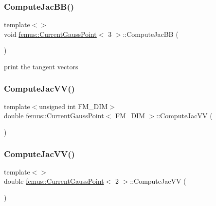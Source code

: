 \subsubsection{\texorpdfstring{Compute\+Jac\+B\+B()}{ComputeJacBB()}\hspace{0.1cm}{\footnotesize\ttfamily [3/3]}}
{\footnotesize\ttfamily template$<$$>$ \\
void \mbox{\hyperlink{classfemus_1_1_current_gauss_point}{femus\+::\+Current\+Gauss\+Point}}$<$ 3 $>$\+::Compute\+Jac\+BB (\begin{DoxyParamCaption}{ }\end{DoxyParamCaption})\hspace{0.3cm}{\ttfamily [protected]}}

print the tangent vectors \mbox{\label{classfemus_1_1_current_gauss_point_aa169b843fa89bc565b0757cc57b0e4d7}} 
\subsubsection{\texorpdfstring{Compute\+Jac\+V\+V()}{ComputeJacVV()}\hspace{0.1cm}{\footnotesize\ttfamily [1/3]}}
{\footnotesize\ttfamily template$<$unsigned int F\+M\+\_\+\+D\+IM$>$ \\
double \mbox{\hyperlink{classfemus_1_1_current_gauss_point}{femus\+::\+Current\+Gauss\+Point}}$<$ F\+M\+\_\+\+D\+IM $>$\+::Compute\+Jac\+VV (\begin{DoxyParamCaption}{ }\end{DoxyParamCaption})\hspace{0.3cm}{\ttfamily [protected]}}

\mbox{\label{classfemus_1_1_current_gauss_point_a76637d593d498d6abc7bd3190303d2fc}} 
\subsubsection{\texorpdfstring{Compute\+Jac\+V\+V()}{ComputeJacVV()}\hspace{0.1cm}{\footnotesize\ttfamily [2/3]}}
{\footnotesize\ttfamily template$<$$>$ \\
double \mbox{\hyperlink{classfemus_1_1_current_gauss_point}{femus\+::\+Current\+Gauss\+Point}}$<$ 2 $>$\+::Compute\+Jac\+VV (\begin{DoxyParamCaption}{ }\end{DoxyParamCaption})\hspace{0.3cm}{\ttfamily [protected]}}

